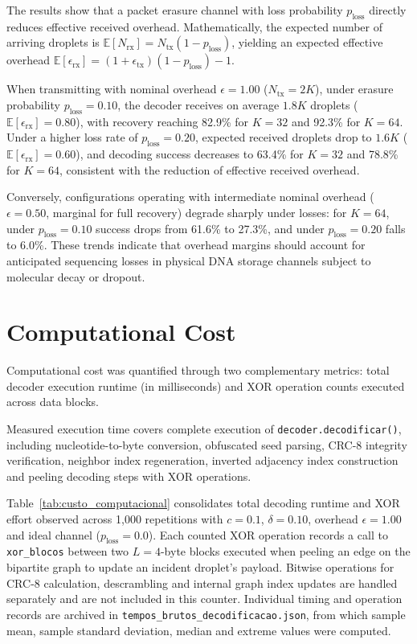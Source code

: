 The results show that a packet erasure channel with loss probability $p_{\text{loss}}$ directly reduces effective received overhead. Mathematically, the expected number of arriving droplets is $\mathbb{E}[N_{\text{rx}}] = N_{\text{tx}}(1 - p_{\text{loss}})$, yielding an expected effective overhead $\mathbb{E}[\epsilon_{\text{rx}}] = (1 + \epsilon_{\text{tx}})(1 - p_{\text{loss}}) - 1$.

When transmitting with nominal overhead $\epsilon = 1.00$ ($N_{\text{tx}} = 2K$), under erasure probability $p_{\text{loss}} = 0.10$, the decoder receives on average $1.8K$ droplets ($\mathbb{E}[\epsilon_{\text{rx}}] = 0.80$), with recovery reaching 82.9\% for $K = 32$ and 92.3\% for $K = 64$. Under a higher loss rate of $p_{\text{loss}} = 0.20$, expected received droplets drop to $1.6K$ ($\mathbb{E}[\epsilon_{\text{rx}}] = 0.60$), and decoding success decreases to 63.4\% for $K = 32$ and 78.8\% for $K = 64$, consistent with the reduction of effective received overhead.

Conversely, configurations operating with intermediate nominal overhead ($\epsilon = 0.50$, marginal for full recovery) degrade sharply under losses: for $K = 64$, under $p_{\text{loss}} = 0.10$ success drops from 61.6\% to 27.3\%, and under $p_{\text{loss}} = 0.20$ falls to 6.0\%. These trends indicate that overhead margins should account for anticipated sequencing losses in physical DNA storage channels subject to molecular decay or dropout.

\section{Computational Cost}
\label{sec:results_computational_cost}

Computational cost was quantified through two complementary metrics: total decoder execution runtime (in milliseconds) and XOR operation counts executed across data blocks.

Measured execution time covers complete execution of \texttt{decoder.\allowbreak decodificar()}, including nucleotide-to-byte conversion, obfuscated seed parsing, CRC-8 integrity verification, neighbor index regeneration, inverted adjacency index construction and peeling decoding steps with XOR operations.

Table~\ref{tab:custo_computacional} consolidates total decoding runtime and XOR effort observed across 1,000 repetitions with $c = 0.1$, $\delta = 0.10$, overhead $\epsilon = 1.00$ and ideal channel ($p_{\text{loss}} = 0.0$). Each counted XOR operation records a call to \texttt{xor\_blocos} between two $L = 4$-byte blocks executed when peeling an edge on the bipartite graph to update an incident droplet's payload. Bitwise operations for CRC-8 calculation, descrambling and internal graph index updates are handled separately and are not included in this counter. Individual timing and operation records are archived in \texttt{tempos\_brutos\_decodificacao.json}, from which sample mean, sample standard deviation, median and extreme values were computed.

